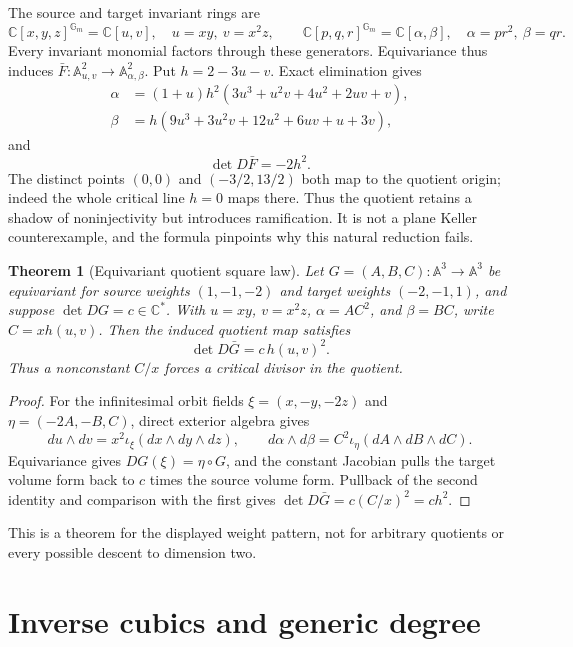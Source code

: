 \documentclass[11pt]{article}
\newtheorem{theorem}{Theorem}[section]
\theoremstyle{remark}
\newcommand{\A}{\mathbb A}
\newcommand{\C}{\mathbb C}
\begin{document}
The source and target invariant rings are
\[
\C[x,y,z]^{\mathbb G_m}=\C[u,v],\quad u=xy,\ v=x^2z,
\qquad
\C[p,q,r]^{\mathbb G_m}=\C[\alpha,\beta],\quad
\alpha=pr^2,\ \beta=qr.
\]
Every invariant monomial factors through these generators. Equivariance thus
induces $\bar F:\A^2_{u,v}\to\A^2_{\alpha,\beta}$. Put $h=2-3u-v$.
Exact elimination gives
\begin{align*}
\alpha&=(1+u)h^2(3u^3+u^2v+4u^2+2uv+v),\\
\beta&=h(9u^3+3u^2v+12u^2+6uv+u+3v),
\end{align*}
and
\[
\det D\bar F=-2h^2.
\]
The distinct points $(0,0)$ and $(-3/2,13/2)$ both map to the quotient origin;
indeed the whole critical line $h=0$ maps there. Thus the quotient retains a
shadow of noninjectivity but introduces ramification. It is not a plane Keller
counterexample, and the formula pinpoints why this natural reduction fails.

\begin{theorem}[Equivariant quotient square law]\label{thm:squarelaw}
Let $G=(A,B,C):\A^3\to\A^3$ be equivariant for source weights
$(1,-1,-2)$ and target weights $(-2,-1,1)$, and suppose $\det DG=c\in\C^*$.
With $u=xy$, $v=x^2z$, $\alpha=AC^2$, and $\beta=BC$, write
$C=xh(u,v)$. Then the induced quotient map satisfies
\[
\det D\bar G=c\,h(u,v)^2.
\]
Thus a nonconstant $C/x$ forces a critical divisor in the quotient.
\end{theorem}
\begin{proof}
For the infinitesimal orbit fields $\xi=(x,-y,-2z)$ and
$\eta=(-2A,-B,C)$, direct exterior algebra gives
\[
du\wedge dv=x^2\iota_\xi(dx\wedge dy\wedge dz),\qquad
d\alpha\wedge d\beta=C^2\iota_\eta(dA\wedge dB\wedge dC).
\]
Equivariance gives $DG(\xi)=\eta\circ G$, and the constant Jacobian pulls the
target volume form back to $c$ times the source volume form. Pullback of the
second identity and comparison with the first gives
$\det D\bar G=c(C/x)^2=ch^2$.
\end{proof}

This is a theorem for the displayed weight pattern, not for arbitrary
quotients or every possible descent to dimension two.

\section{Inverse cubics and generic degree}
\end{document}
